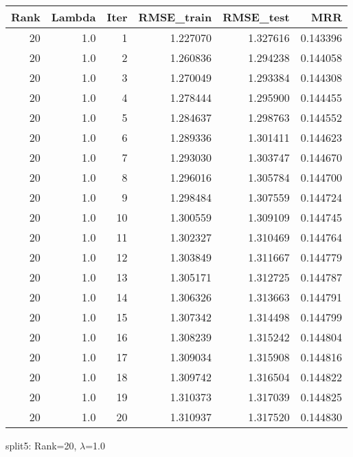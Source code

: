 \begin{tabular}{rrrrrr}
\toprule
 Rank &  Lambda &  Iter &  RMSE\_train &  RMSE\_test &       MRR \\
\midrule
   20 &     1.0 &     1 &    1.227070 &   1.327616 &  0.143396 \\
   20 &     1.0 &     2 &    1.260836 &   1.294238 &  0.144058 \\
   20 &     1.0 &     3 &    1.270049 &   1.293384 &  0.144308 \\
   20 &     1.0 &     4 &    1.278444 &   1.295900 &  0.144455 \\
   20 &     1.0 &     5 &    1.284637 &   1.298763 &  0.144552 \\
   20 &     1.0 &     6 &    1.289336 &   1.301411 &  0.144623 \\
   20 &     1.0 &     7 &    1.293030 &   1.303747 &  0.144670 \\
   20 &     1.0 &     8 &    1.296016 &   1.305784 &  0.144700 \\
   20 &     1.0 &     9 &    1.298484 &   1.307559 &  0.144724 \\
   20 &     1.0 &    10 &    1.300559 &   1.309109 &  0.144745 \\
   20 &     1.0 &    11 &    1.302327 &   1.310469 &  0.144764 \\
   20 &     1.0 &    12 &    1.303849 &   1.311667 &  0.144779 \\
   20 &     1.0 &    13 &    1.305171 &   1.312725 &  0.144787 \\
   20 &     1.0 &    14 &    1.306326 &   1.313663 &  0.144791 \\
   20 &     1.0 &    15 &    1.307342 &   1.314498 &  0.144799 \\
   20 &     1.0 &    16 &    1.308239 &   1.315242 &  0.144804 \\
   20 &     1.0 &    17 &    1.309034 &   1.315908 &  0.144816 \\
   20 &     1.0 &    18 &    1.309742 &   1.316504 &  0.144822 \\
   20 &     1.0 &    19 &    1.310373 &   1.317039 &  0.144825 \\
   20 &     1.0 &    20 &    1.310937 &   1.317520 &  0.144830 \\
\bottomrule
\end{tabular}

\caption{split5: Rank=20, $\lambda$=1.0}
